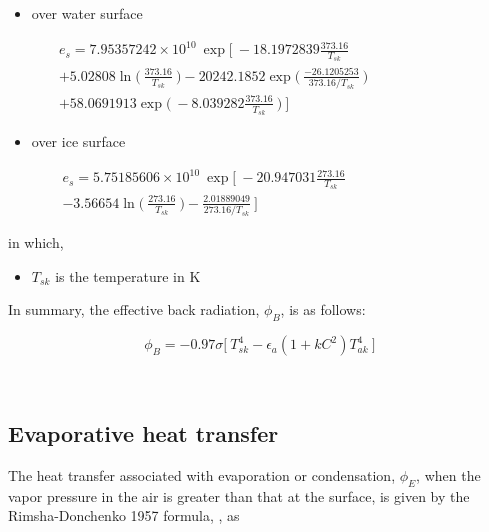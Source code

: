\begin{itemize}
	\renewcommand{\labelitemi}{\textbullet}
	\item over water surface
\end{itemize}
\begin{equation} \label{eq:esw}
  \begin{split}
e_s = 7.95357242\times 10^{10}
     \ \exp \bigg[\ -18.1972839\frac{373.16}{T_{sk}} \qquad \qquad  \qquad \qquad \\
 + 5.02808 \ln\Big(\ \frac{373.16}{T_{sk}}\ \Big) -20242.1852 \exp\Big(\ \frac{-26.1205253}{373.16/T_{sk}}\ \Big)  \qquad \\
 + 58.0691913 \exp\Big(\ -8.039282\frac{373.16}{T_{sk}}\ \Big) \ \bigg]
  \end{split}
\end{equation}

\begin{itemize}
	\renewcommand{\labelitemi}{\textbullet}
	\item over ice surface
\end{itemize}
\begin{equation} \label{eq:esi}
   \begin{split}
e_s = 5.75185606\times 10^{10}
     \ \exp \bigg[\ -20.947031\frac{273.16}{T_{sk}}\qquad \qquad  \qquad \qquad \\
      -3.56654 \ln\Big(\ \frac{273.16}{T_{sk}}\ \Big) - \frac{2.01889049}{273.16/T_{sk}}\ \bigg]
   \end{split}
\end{equation}

in which,
\begin{itemize}
	\item $T_{sk}$ is the temperature in K
\end{itemize}

In summary, the effective back radiation, $\phi_B$, is as follows:

\begin{equation} \label{eq:phiball}
\phi_B=-0.97\sigma\Big[\ T_{sk}^4-\epsilon_a ( 1+kC^2 ) T_{ak}^4\ \Big]
\end{equation}

~\newline
\subsection{Evaporative heat transfer}

The heat transfer associated with evaporation or condensation, $\phi_E$, when the vapor pressure in the air is greater than that at the surface, is given by the Rimsha-Donchenko 1957 formula, \cite{rimsha1957investigation}, as

